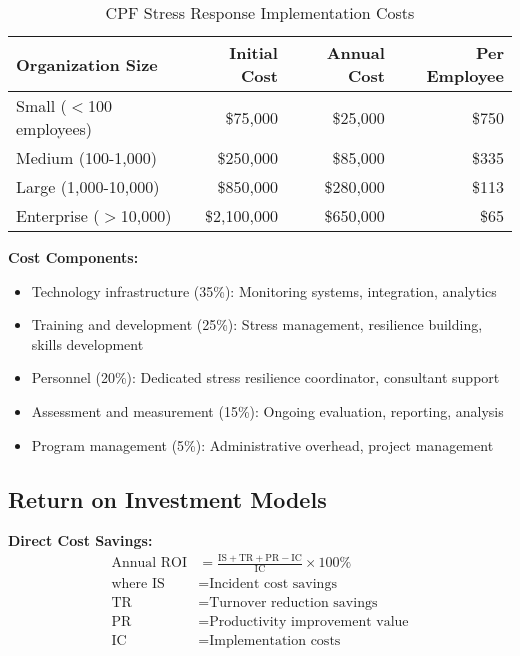 \documentclass[11pt,a4paper]{article}
\begin{document}
\begin{table}[H]
\centering
\caption{CPF Stress Response Implementation Costs}
\label{tab:implementation_costs}
\begin{tabular}{lrrr}
\toprule
Organization Size & Initial Cost & Annual Cost & Per Employee \\
\midrule
Small ($<$100 employees) & \$75,000 & \$25,000 & \$750 \\
Medium (100-1,000) & \$250,000 & \$85,000 & \$335 \\
Large (1,000-10,000) & \$850,000 & \$280,000 & \$113 \\
Enterprise ($>$10,000) & \$2,100,000 & \$650,000 & \$65 \\
\bottomrule
\end{tabular}
\end{table}

\FloatBarrier

\textbf{Cost Components:}
\begin{itemize}
\item Technology infrastructure (35\%): Monitoring systems, integration, analytics
\item Training and development (25\%): Stress management, resilience building, skills development
\item Personnel (20\%): Dedicated stress resilience coordinator, consultant support
\item Assessment and measurement (15\%): Ongoing evaluation, reporting, analysis
\item Program management (5\%): Administrative overhead, project management
\end{itemize}

\subsection{Return on Investment Models}

\textbf{Direct Cost Savings:}
\begin{align}
\text{Annual ROI} &= \frac{\text{IS} + \text{TR} + \text{PR} - \text{IC}}{\text{IC}} \times 100\% \\
\text{where IS} &= \text{Incident cost savings} \\
\text{TR} &= \text{Turnover reduction savings} \\
\text{PR} &= \text{Productivity improvement value} \\
\text{IC} &= \text{Implementation costs}
\end{align}
\end{document}
